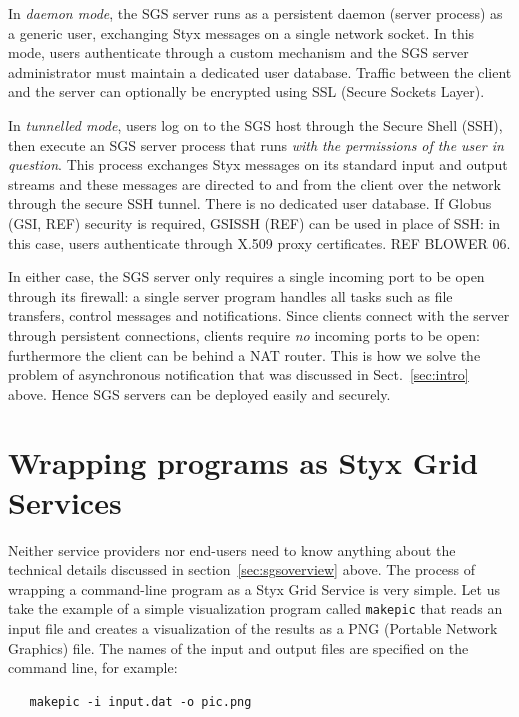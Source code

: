 \documentclass[a4paper]{article}
\begin{document}
In \textit{daemon mode}, the SGS server runs as a persistent daemon (server process) as a generic user, exchanging Styx messages on a single network socket.  In this mode, users authenticate through a custom mechanism and the SGS server administrator must maintain a dedicated user database.  Traffic between the client and the server can optionally be encrypted using SSL (Secure Sockets Layer).

In \textit{tunnelled mode}, users log on to the SGS host through the Secure Shell (SSH), then execute an SGS server process that runs \textit{with the permissions of the user in question}.  This process exchanges Styx messages on its standard input and output streams and these messages are directed to and from the client over the network through the secure SSH tunnel.  There is no dedicated user database.  If Globus (GSI, REF) security is required, GSISSH (REF) can be used in place of SSH: in this case, users authenticate through X.509 proxy certificates.  REF BLOWER 06.

In either case, the SGS server only requires a single incoming port to be open through its firewall: a single server program handles all tasks such as file transfers, control messages and notifications.  Since clients connect with the server through persistent connections, clients require \textit{no} incoming ports to be open: furthermore the client can be behind a NAT router.  This is how we solve the problem of asynchronous notification that was discussed in Sect.~\ref{sec:intro} above.  Hence SGS servers can be deployed easily and securely.


\section{Wrapping programs as Styx Grid Services}\label{sec:wrapping}
Neither service providers nor end-users need to know anything about the technical details discussed in section~\ref{sec:sgsoverview} above.  The process of wrapping a command-line program as a Styx Grid Service is very simple.  Let us take the example of a simple visualization program called \texttt{makepic} that reads an input file and creates a visualization of the results as a PNG (Portable Network Graphics) file.  The names of the input and output files are specified on the command line, for example:

\begin{verbatim}
   makepic -i input.dat -o pic.png
\end{verbatim}
\end{document}

